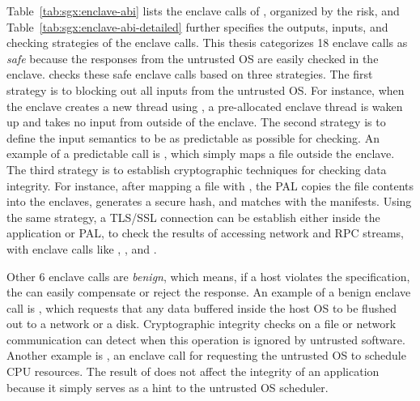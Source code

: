 Table~\ref{tab:sgx:enclave-abi} lists the \enclavecallnum{} enclave calls of \graphenesgx{},
organized by the risk,
and Table~\ref{tab:sgx:enclave-abi-detailed} further specifies the outputs, inputs, and checking strategies of the enclave calls.
This thesis categorizes
18 enclave calls as {\em safe} because
the responses from the untrusted OS are
easily checked in the enclave.
\graphenesgx{} checks these safe enclave calls based on three strategies.
The first strategy is to blocking out all inputs from the untrusted OS. For instance, when the enclave creates a new thread using , a pre-allocated enclave thread is waken up and takes no input from outside of the enclave.
The second strategy is to define the input semantics to be as predictable as possible for checking. An example of a predictable call is , which simply maps a file outside the enclave.
The third strategy is to establish cryptographic techniques
for checking data integrity.
For instance,
after mapping a file with ,
the \sgx{} PAL copies the file contents into the enclaves, generates a secure hash,
and matches with the manifests.
Using the same strategy, a TLS/SSL connection can be establish either inside the application or PAL,
to check the results of accessing network and RPC streams,
with enclave calls like
, , and .




Other 6 enclave calls are {\em benign}, which means, if a host violates the specification,
the \libos{} can easily compensate or reject the response.
An example of a benign enclave call is ,
which requests that any data buffered inside the host OS to be flushed out to a network or a disk.
Cryptographic integrity checks on a file or network communication can detect when this operation is ignored by untrusted software.
Another example is ,
an enclave call for requesting the untrusted OS to schedule CPU resources.
The result of  does not affect the integrity of an application
because it simply serves as a hint
to the untrusted OS scheduler.



